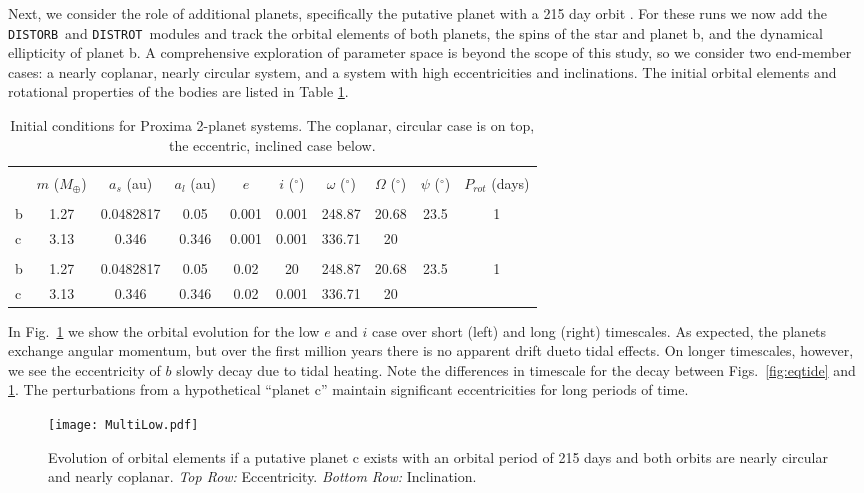 \documentclass[preprint,12pt]{aastex}
\def\distorb{\texttt{\footnotesize{DISTORB}}\xspace}
\def\distrot{\texttt{\footnotesize{DISTROT}}\xspace}
\begin{document}
Next, we consider the role of additional planets, specifically the
putative planet with a 215 day orbit \citep{AngladaEscude16}. For
these runs we now add the \distorb~and \distrot~modules and track the
orbital elements of both planets, the spins of the star and planet b,
and the dynamical ellipticity of planet b. A comprehensive exploration
of parameter space is beyond the scope of this study, so we consider
two end-member cases: a nearly coplanar, nearly circular system, and a
system with high eccentricities and inclinations. The initial orbital
elements and rotational properties of the bodies are listed in Table
\ref{tab:orbitic}.

\begin{table}[h]
\centering
\begin{tabular}{lccccccccc}
\hline\hline \\[-1.5ex]
& $m$ ($M_{\oplus}$)  & $a_s$ (au) & $a_l$ (au) & $e$ & $i$ ($^{\circ}$)
 & $\omega$ ($^{\circ}$) & $\Omega$ ($^{\circ}$) & $\psi$ ($^{\circ}$) & 
 $P_{rot}$ (days)\\[0.5ex]
\hline \\ [-1.5ex]
b & 1.27 & 0.0482817 & 0.05 & 0.001 & 0.001 & 248.87 & 20.68 & 23.5 & 1  \\
c & 3.13 & 0.346 & 0.346 & 0.001 & 0.001 & 336.71 & 20 & &  \\
\hline \\
b & 1.27 & 0.0482817 & 0.05 & 0.02 & 20 & 248.87 & 20.68 & 23.5 & 1  \\
c & 3.13 & 0.346 & 0.346 & 0.02 & 0.001 & 336.71 & 20 & &  \\
\end{tabular}
\caption{Initial conditions for Proxima 2-planet systems. The coplanar, 
  circular case is on top, the eccentric, inclined case below.}
\label{tab:orbitic}
\end{table}

In Fig.~\ref{fig:MultiLow} we show the orbital evolution for the low
$e$ and $i$ case over short (left) and long (right) timescales. As
expected, the planets exchange angular momentum, but over the first
million years there is no apparent drift dueto tidal effects. On
longer timescales, however, we see the eccentricity of $b$ slowly decay
due to tidal heating. Note the differences in timescale for the decay
between Figs.~\ref{fig:eqtide} and \ref{fig:MultiLow}. The
perturbations from a hypothetical ``planet c'' maintain significant
eccentricities for long periods of time.

\begin{figure} 
\begin{center}
\texttt{[image: MultiLow.pdf]}
\end{center}
\caption{Evolution of orbital elements if a putative planet c exists with an 
orbital period of 215 days and both orbits are nearly circular and nearly 
coplanar. {\it Top Row:} Eccentricity. {\it Bottom Row:} Inclination.}
\label{fig:MultiLow}
\end{figure}
\end{document}
